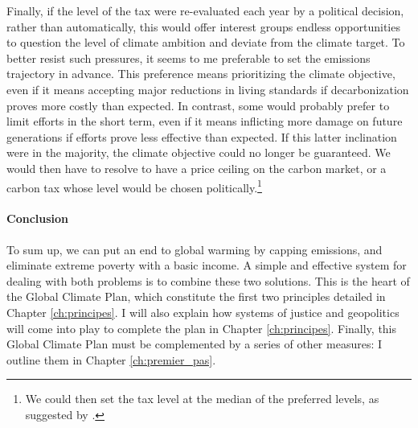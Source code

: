 \documentclass[a5paper,english,openany]{memoir}
\begin{document}
Finally, if the level of the tax were re-evaluated each year by a political decision, rather than automatically, %
this would offer interest groups endless opportunities to question the level of climate ambition and deviate from the climate target. To better resist such pressures, it seems to me preferable to set the emissions trajectory in advance. This preference means prioritizing %
the climate objective, even if it means accepting major reductions in living standards if decarbonization %
proves more costly than expected. 
In contrast, %
some would probably prefer to limit efforts in the short term, even if it means inflicting more damage on future generations if efforts prove less effective than expected. If this latter inclination were in the majority, the climate objective could no longer be guaranteed. We would then have to resolve to have a price ceiling %
on the carbon market, or a carbon tax whose level would be chosen politically.\footnote{We could then set the tax level at the median of the preferred levels, as suggested by \cite{weitzman_world_2017}.}

\paragraph{Conclusion}
To sum up, we can put an end to global warming
by capping emissions, and eliminate extreme poverty with a basic income. A simple and effective system for dealing with both problems is to combine these two solutions. This is the heart of the Global Climate Plan, %
which constitute the first two principles detailed in Chapter \ref{ch:principes}.  I will also explain how systems of justice  and geopolitics will come into play to complete the plan %
 in Chapter \ref{ch:principes}. %
Finally, this Global Climate Plan must be complemented by a series of other measures: %
I outline them in Chapter \ref{ch:premier_pas}.

\end{document}

